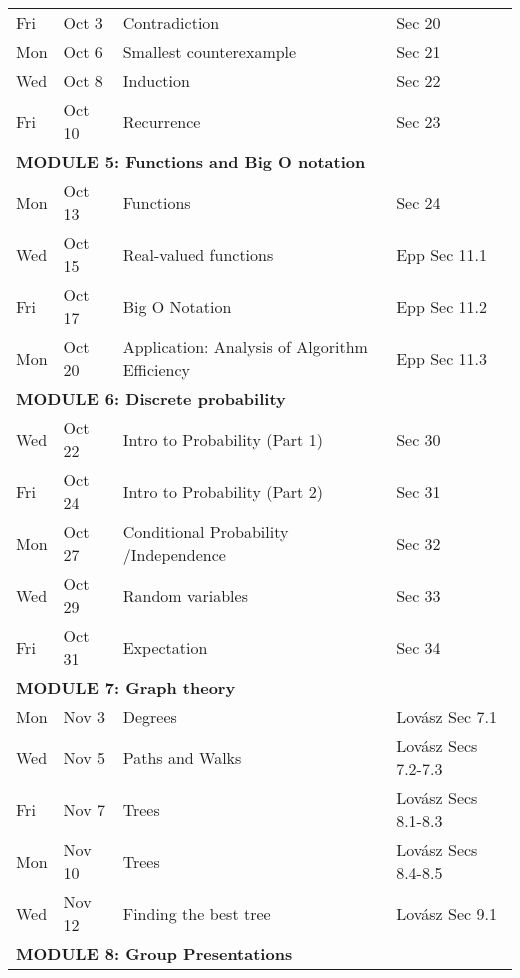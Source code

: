 \documentclass[letterpaper]{inzane_syllabus} %
\begin{document}
\begin{center}
\begin{tabularx}{\textwidth}{p{2cm}p{2cm}p{8cm}p{9.5cm}}
Fri &  Oct 3 & Contradiction & Sec 20 \\
Mon &  Oct 6 & Smallest counterexample & Sec 21 \\
Wed &  Oct 8 & Induction & Sec 22  \\
Fri &  Oct 10 & Recurrence  & Sec 23 \\
\hline
\multicolumn{4}{l}{\textbf{\textcolor{myCOLOR}{\large MODULE 5: Functions and Big O notation}}} \\
\hline
Mon &  Oct 13  & Functions & Sec 24 \\
Wed &  Oct 15  & Real-valued functions & Epp Sec 11.1 \\
Fri &  Oct 17 & Big O Notation & Epp Sec 11.2 \\
Mon &  Oct 20  & Application: Analysis of Algorithm Efficiency & Epp Sec 11.3 \\
\hline
\multicolumn{4}{l}{\textbf{\textcolor{myCOLOR}{\large MODULE 6: Discrete probability}}} \\
\hline
Wed & Oct 22  & Intro to Probability (Part 1) & Sec 30 \\ 
Fri & Oct 24 &  Intro to Probability  (Part 2) & Sec 31 \\
Mon &  Oct 27 & Conditional Probability /Independence &  Sec 32\\
Wed &  Oct 29  &  Random variables & Sec 33 \\
Fri &  Oct 31 & Expectation & Sec 34 \\
\hline
\multicolumn{4}{l}{\textbf{\textcolor{myCOLOR}{\large MODULE 7: Graph theory}}} \\
\hline
Mon &  Nov 3 & Degrees & Lov\'asz Sec 7.1 \\
Wed &  Nov 5 & Paths and Walks & Lov\'asz Secs 7.2-7.3 \\
Fri &  Nov 7  & Trees & Lov\'asz Secs 8.1-8.3 \\
Mon &  Nov 10 & Trees & Lov\'asz Secs 8.4-8.5 \\
Wed &  Nov 12 & Finding the best tree & Lov\'asz Sec 9.1 \\
\hline
\multicolumn{4}{l}{\textbf{\textcolor{myCOLOR}{\large MODULE 8: Group Presentations}}} \\
\hline

\end{tabularx}
\end{center}
\end{document}
